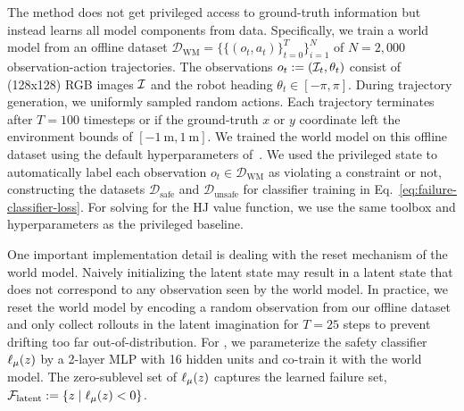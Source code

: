 The \ours method does not get privileged access to ground-truth information but instead learns all model components from data.
Specifically, we train a world model from an offline dataset $\mathcal{D}_\mathrm{WM} = \{\{(o_t, a_t)\}_{t=0}^T\}^N_{i=1}$ of $N=2,000$ observation-action trajectories. The observations $o_t := (\mathcal{I}_t, \theta_t)$ consist of (128x128) RGB images $\mathcal{I}$ and the robot heading $\theta_t \in [-\pi, \pi]$. 
During trajectory generation, we uniformly sampled random actions. 
Each trajectory terminates after $T=100$ timesteps or if the ground-truth $x$ or $y$ coordinate left the environment bounds of $[\SI{-1}{\meter}, \SI{1}{\meter}]$. 
We trained the world model on this offline dataset using the default hyperparameters of~\cite{dreamerv3-torch}.
We used the privileged state to automatically label each observation $o_t \in \mathcal{D}_\mathrm{WM}$ as violating a constraint or not, constructing the datasets $\mathcal{D}_{\text{safe}}$ and $\mathcal{D}_{\text{unsafe}}$ for classifier training in Eq.~\ref{eq:failure-classifier-loss}. 
For solving for the HJ value function, we use the same toolbox and hyperparameters as the privileged baseline. 


One important implementation detail is dealing with the reset mechanism of the world model. Naively initializing the latent state may result in a latent state that does not correspond to any observation seen by the world model. 
In practice, we reset the world model by encoding a random observation from our offline dataset and only collect rollouts in the latent imagination for $T=25$ steps to prevent drifting too far out-of-distribution.
For \ours, we parameterize the safety classifier $\ell_\mu(z)$ by a 2-layer MLP with 16 hidden units and co-train it with the world model.
The zero-sublevel set of $\ell_\mu(z)$ captures the learned failure set, $\mathcal{F}_\textrm{latent} := \{ z \mid \ell_\mu(z) < 0\}$.










